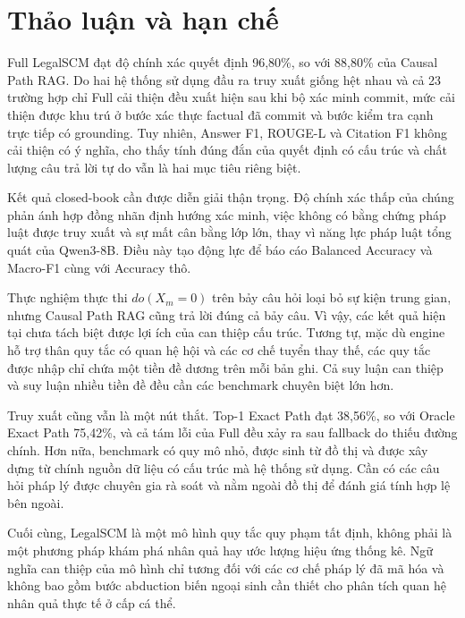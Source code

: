\section{Thảo luận và hạn chế}
\label{sec:discussion_limitations}

Full LegalSCM đạt độ chính xác quyết định 96,80\%, so với 88,80\% của Causal
Path RAG. Do hai hệ thống sử dụng đầu ra truy xuất giống hệt nhau và cả 23
trường hợp chỉ Full cải thiện đều xuất hiện sau khi bộ xác minh commit, mức cải
thiện được khu trú ở bước xác thực factual đã commit và bước kiểm tra cạnh trực
tiếp có grounding. Tuy nhiên, Answer F1, ROUGE-L và Citation F1 không cải thiện
có ý nghĩa, cho thấy tính đúng đắn của quyết định có cấu trúc và chất lượng câu
trả lời tự do vẫn là hai mục tiêu riêng biệt.

Kết quả closed-book cần được diễn giải thận trọng. Độ chính xác thấp của chúng
phản ánh hợp đồng nhãn định hướng xác minh, việc không có bằng chứng pháp luật
được truy xuất và sự mất cân bằng lớp lớn, thay vì năng lực pháp luật tổng quát
của Qwen3-8B. Điều này tạo động lực để báo cáo Balanced Accuracy và Macro-F1
cùng với Accuracy thô.

Thực nghiệm thực thi $do(X_m=0)$ trên bảy câu hỏi loại bỏ sự kiện trung gian,
nhưng Causal Path RAG cũng trả lời đúng cả bảy câu. Vì vậy, các kết quả hiện tại
chưa tách biệt được lợi ích của can thiệp cấu trúc. Tương tự, mặc dù engine hỗ
trợ thân quy tắc có quan hệ hội và các cơ chế tuyển thay thế, các quy tắc được
nhập chỉ chứa một tiền đề dương trên mỗi bản ghi. Cả suy luận can thiệp và suy
luận nhiều tiền đề đều cần các benchmark chuyên biệt lớn hơn.

Truy xuất cũng vẫn là một nút thắt. Top-1 Exact Path đạt 38,56\%, so với Oracle
Exact Path 75,42\%, và cả tám lỗi của Full đều xảy ra sau fallback do thiếu
đường chính. Hơn nữa, benchmark có quy mô nhỏ, được sinh từ đồ thị và được xây
dựng từ chính nguồn dữ liệu có cấu trúc mà hệ thống sử dụng. Cần có các câu hỏi
pháp lý được chuyên gia rà soát và nằm ngoài đồ thị để đánh giá tính hợp lệ bên
ngoài.

Cuối cùng, LegalSCM là một mô hình quy tắc quy phạm tất định, không phải là một
phương pháp khám phá nhân quả hay ước lượng hiệu ứng thống kê. Ngữ nghĩa can
thiệp của mô hình chỉ tương đối với các cơ chế pháp lý đã mã hóa và không bao
gồm bước abduction biến ngoại sinh cần thiết cho phân tích quan hệ nhân quả
thực tế ở cấp cá thể.

